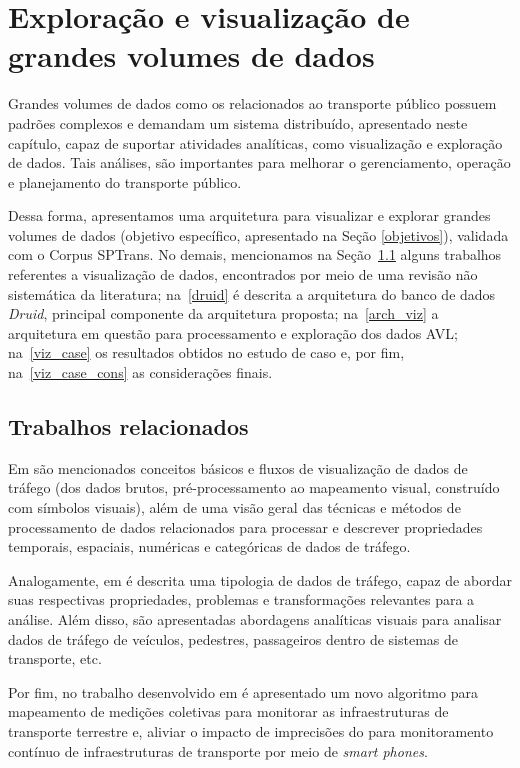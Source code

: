 \documentclass[
	12pt,				%
	oneside,			%
	a4paper,			%
	english,			%
	brazil				%
	]{abntex2ppgsi}
\begin{document}
{{{\chapter{Exploração e visualização de grandes volumes de dados}
\label{dataViz}

Grandes volumes de dados como os relacionados ao transporte público possuem padrões complexos e demandam um sistema distribuído, apresentado neste capítulo, capaz de suportar atividades analíticas, como visualização e exploração de dados. Tais análises, são importantes para melhorar o gerenciamento, operação e planejamento do transporte público.

Dessa forma, apresentamos uma arquitetura para visualizar e explorar grandes volumes de dados (objetivo específico, apresentado na Seção \ref{objetivos}), validada com o Corpus SPTrans.  No demais, mencionamos na Seção~\ref{related_work_data_viz} alguns trabalhos referentes a visualização de dados, encontrados por meio de uma revisão não sistemática da literatura; na~\ref{druid} é descrita a arquitetura do banco de dados \textit{Druid}, principal componente da arquitetura proposta; na~\ref{arch_viz} a arquitetura em questão para processamento e exploração dos dados AVL; na~\ref{viz_case} os resultados obtidos no estudo de caso e, por fim, na~\ref{viz_case_cons} as considerações finais.

\section{Trabalhos relacionados}
\label{related_work_data_viz}

Em \cite{chen2015survey} são mencionados conceitos básicos e fluxos de visualização de dados de tráfego (dos dados brutos, pré-processamento ao mapeamento visual, construído com símbolos visuais), além de uma visão geral das técnicas e métodos de processamento de dados relacionados para processar e descrever propriedades temporais, espaciais, numéricas e categóricas de dados de tráfego.

Analogamente, em \cite{andrienko2017visual} é descrita uma tipologia de dados de tráfego, capaz de abordar suas respectivas propriedades, problemas e transformações relevantes para a análise. Além disso, são apresentadas abordagens analíticas visuais para analisar dados de tráfego de veículos, pedestres, passageiros dentro de sistemas de transporte, etc.

Por fim, no trabalho desenvolvido em \cite{seraj2017aggregation} é apresentado um novo algoritmo para mapeamento de medições coletivas para monitorar as infraestruturas de transporte terrestre e, aliviar o impacto de imprecisões do  para monitoramento contínuo de infraestruturas de transporte por meio de \textit{smart phones}.

}}}
\end{document}
